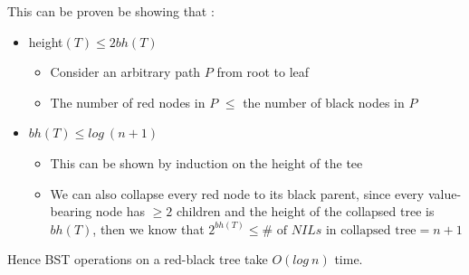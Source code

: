 \documentclass{article}
\theoremstyle{plain}
\theoremstyle{definition}
\begin{document}
        This can be proven be showing that :
        \begin{itemize}
            \item height$(T) \leq 2 bh(T)$
                \begin{itemize}
                    \item Consider an arbitrary path $P$ from root to leaf
                    \item The number of red nodes in $P$ $\leq$ the number of black nodes in $P$ 
                \end{itemize}
            \item $bh(T) \leq log \ (n+1)$
                \begin{itemize}
                    \item This can be shown by induction on the height of the tee
                    \item We can also collapse every red node to its black parent, since every value-bearing node has $\geq 2$ children and the height of the collapsed tree is $bh(T)$, then we know that $2^{bh(T)} \leq \# \text{ of } NILs \text{ in collapsed tree} = n + 1$
                \end{itemize}
        \end{itemize}

        Hence BST operations on a red-black tree take $O(log \ n)$ time. \\ \\
\end{document}
